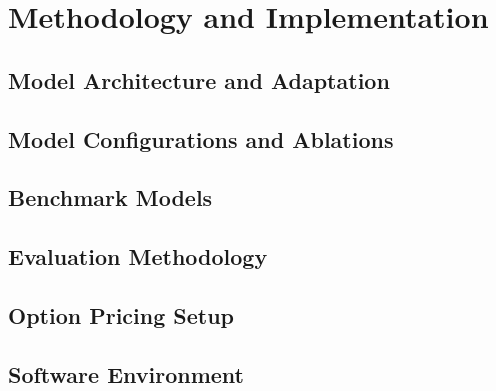 \section{Methodology and Implementation}\label{sec:methodology}



\subsection{Model Architecture and Adaptation}\label{sec:model}



\subsection{Model Configurations and Ablations}\label{sec:configurations}
\subsection{Benchmark Models}\label{sec:benchmarks}
\subsection{Evaluation Methodology}\label{sec:evaluation}
\subsection{Option Pricing Setup}\label{sec:pricing-setup}
\clearpage

\subsection{Software Environment}\label{sec:software}



